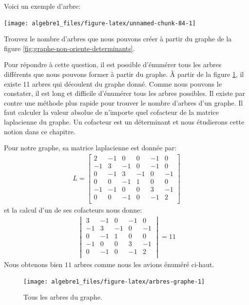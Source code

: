 \documentclass[]{book}
\theoremstyle{definition}
\theoremstyle{definition}
\theoremstyle{definition}
\theoremstyle{remark}
\let\BeginKnitrBlock\begin \let\EndKnitrBlock\end
\begin{document}
Voici un exemple d'arbre:

\begin{center}\texttt{[image: algebre1\_files/figure-latex/unnamed-chunk-84-1]} \end{center}

\BeginKnitrBlock{example}
\protect\hypertarget{exm:unnamed-chunk-85}{}{\label{exm:unnamed-chunk-85} }Trouvez le nombre d'arbres que nous pouvons créer à partir du graphe de la figure \ref{fig:graphe-non-oriente-determinants}.

Pour répondre à cette question, il est possible d'énumérer tous les arbres différents que nous pouvons former à partir du graphe. À partir de la figure \ref{fig:arbres-graphe}, il existe 11 arbres qui découlent du graphe donné. Comme nous pouvons le constater, il est long et difficile d'énumérer tous les arbres possibles. Il existe par contre une méthode plus rapide pour trouver le nombre d'arbres d'un graphe. Il faut calculer la valeur absolue de n'importe quel cofacteur de la matrice laplacienne du graphe. Un cofacteur est un déterminant et nous étudierons cette notion dans ce chapitre.

Pour notre graphe, sa matrice laplacienne est donnée par:
\begin{align*}
L = 
\begin{bmatrix}
2&-1&0&0&-1&0\\
-1&3&-1&0&-1&0\\
0&-1&3&-1&0&-1\\
0&0&-1&1&0&0\\
-1&-1&0&0&3&-1\\
0&0&-1&0&-1&2\\
\end{bmatrix}
\end{align*}
et la calcul d'un de ses cofacteurs nous donne:
\begin{align*}
\begin{vmatrix}
3&-1&0&-1&0\\
-1&3&-1&0&-1\\
0&-1&1&0&0\\
-1&0&0&3&-1\\
0&-1&0&-1&2\\
\end{vmatrix}
=
11
\end{align*}
Nous obtenons bien \(11\) arbres comme nous les avions énuméré ci-haut.
\EndKnitrBlock{example}

\begin{figure}

{\centering \texttt{[image: algebre1\_files/figure-latex/arbres-graphe-1]} 

}

\caption{Tous les arbres du graphe.}\label{fig:arbres-graphe}
\end{figure}
\end{document}
